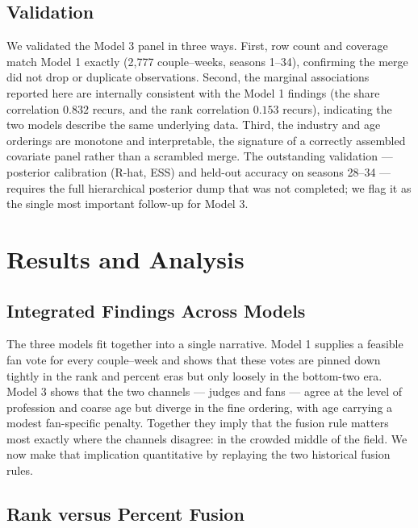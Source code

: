 \documentclass{article}
\begin{document}
\subsection{Validation}

We validated the Model 3 panel in three ways. First, row count and coverage match Model 1
exactly (2{,}777 couple--weeks, seasons 1--34), confirming the merge did not drop or
duplicate observations. Second, the marginal associations reported here are internally
consistent with the Model 1 findings (the share correlation $0.832$ recurs, and the rank
correlation $0.153$ recurs), indicating the two models describe the same underlying data.
Third, the industry and age orderings are monotone and interpretable, the signature of a
correctly assembled covariate panel rather than a scrambled merge. The outstanding
validation --- posterior calibration (R-hat, ESS) and held-out accuracy on seasons 28--34
--- requires the full hierarchical posterior dump that was not completed; we flag it as the
single most important follow-up for Model 3.

\section{Results and Analysis}\label{sec:results}

\subsection{Integrated Findings Across Models}

The three models fit together into a single narrative. Model 1 supplies a feasible fan
vote for every couple--week and shows that these votes are pinned down tightly in the rank
and percent eras but only loosely in the bottom-two era. Model 3 shows that the two
channels --- judges and fans --- agree at the level of profession and coarse age but diverge
in the fine ordering, with age carrying a modest fan-specific penalty. Together they imply
that the fusion rule matters most exactly where the channels disagree: in the crowded middle
of the field. We now make that implication quantitative by replaying the two historical
fusion rules.

\subsection{Rank versus Percent Fusion}
\end{document}
